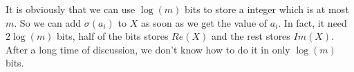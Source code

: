	It is obviously that we can use $ \log(m) $ bits to store a integer which is at most $ m $. So we can add $ \sigma(a_{i}) $ to $ X $ as soon as we get the value of $ a_{i} $. In fact, it need $ 2\log(m) $ bits, half of the bits stores $ Re(X) $ and the rest stores $ Im(X) $. After a long time of discussion, we don't know how to do it in only $ \log(m) $ bits.